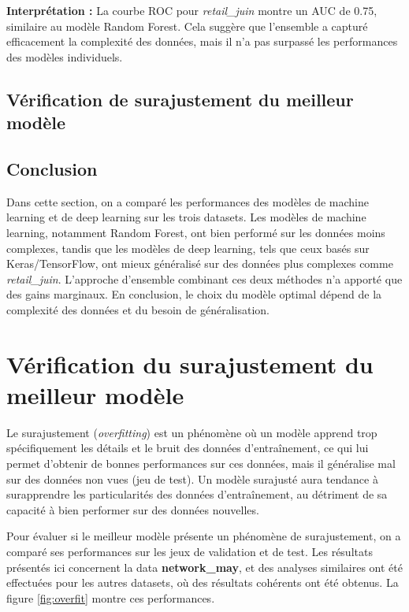 \textbf{Interprétation :} La courbe ROC pour \textit{retail\_juin} montre un AUC de 0.75, similaire au modèle Random Forest. Cela suggère que l'ensemble a capturé efficacement la complexité des données, mais il n'a pas surpassé les performances des modèles individuels.

\subsection{Vérification de surajustement du meilleur modèle}
\subsection{Conclusion}

Dans cette section, on a comparé les performances des modèles de machine learning et de deep learning sur les trois datasets. Les modèles de machine learning, notamment Random Forest, ont bien performé sur les données moins complexes, tandis que les modèles de deep learning, tels que ceux basés sur Keras/TensorFlow, ont mieux généralisé sur des données plus complexes comme \textit{retail\_juin}. L'approche d'ensemble combinant ces deux méthodes n'a apporté que des gains marginaux. En conclusion, le choix du modèle optimal dépend de la complexité des données et du besoin de généralisation.
\section{Vérification du surajustement du meilleur modèle}

Le surajustement (\textit{overfitting}) est un phénomène où un modèle apprend trop spécifiquement les détails et le bruit des données d'entraînement, ce qui lui permet d'obtenir de bonnes performances sur ces données, mais il généralise mal sur des données non vues (jeu de test). Un modèle surajusté aura tendance à surapprendre les particularités des données d'entraînement, au détriment de sa capacité à bien performer sur des données nouvelles.

Pour évaluer si le meilleur modèle présente un phénomène de surajustement, on a comparé ses performances sur les jeux de validation et de test. Les résultats présentés ici concernent la data \textbf{network\_may}, et des analyses similaires ont été effectuées pour les autres datasets, où des résultats cohérents ont été obtenus. La figure \ref{fig:overfit} montre ces performances.

